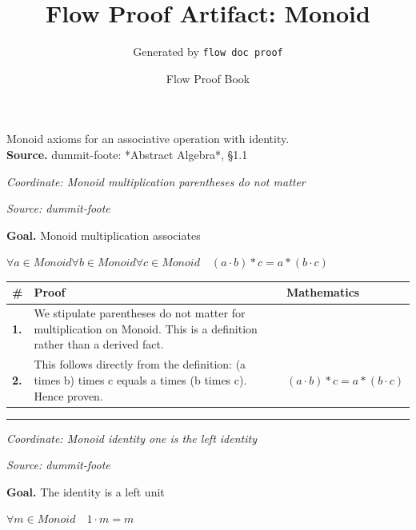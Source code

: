 \documentclass[11pt]{article}
\title{Flow Proof Artifact: Monoid}
\author{Generated by \texttt{flow doc proof}}
\date{Flow Proof Book}
\theoremstyle{definition}
\begin{document}
\maketitle
Monoid axioms for an associative operation with identity.\\[0.5em]
\textbf{Source.} dummit-foote: *Abstract Algebra*, §1.1\\[0.5em]
\bigskip
{}\par
\smallskip\noindent\textit{Coordinate: Monoid \cdot multiplication \cdot parentheses do not matter}\par
\smallskip\noindent\textit{Source: dummit-foote}\par
\medskip
\noindent\textbf{Goal.} Monoid multiplication associates\par
\noindent$\displaystyle \forall a \in Monoid \forall b \in Monoid \forall c \in Monoid\quad (a \cdot b) * c = a * (b \cdot c)$\par
\medskip
\noindent
\begin{tabular}{@{} >{\raggedright\arraybackslash}p{} >{\raggedright\arraybackslash}p{} >{\raggedleft\arraybackslash}p{} @{}}
\textbf{\#} & \textbf{Proof} & \textbf{Mathematics} \\
\midrule
\textbf{1.} & We stipulate parentheses do not matter for multiplication on Monoid. This is a definition rather than a derived fact. & \\[0.45em]
\textbf{2.} & This follows directly from the definition: (a times b) times c equals a times (b times c). Hence proven. & $\displaystyle (a \cdot b) * c = a * (b \cdot c)$ \\[0.45em]
\bottomrule
\end{tabular}
\label{thm:Monoid-multiplication-parentheses_do_not_matter}
\par\medskip\hrule
\bigskip
{}\par
\smallskip\noindent\textit{Coordinate: Monoid \cdot identity \cdot one is the left identity}\par
\smallskip\noindent\textit{Source: dummit-foote}\par
\medskip
\noindent\textbf{Goal.} The identity is a left unit\par
\noindent$\displaystyle \forall m \in Monoid\quad 1 \cdot m = m$\par
\end{document}
